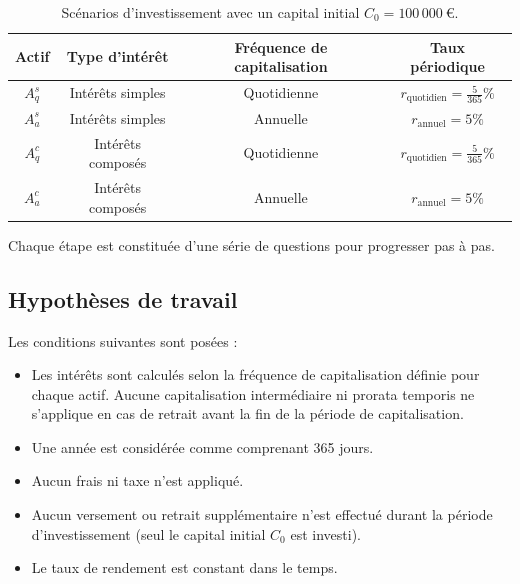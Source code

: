 \documentclass{article}
\begin{document}
\begin{table}[h!]
    \centering
    \begin{tabular}{|c|c|c|c|}
        \hline
        \textbf{Actif} & \textbf{Type d'intérêt} & \textbf{Fréquence de capitalisation} & \textbf{Taux périodique}                \\
        \hline
        \(A_q^s\)      & Intérêts simples        & Quotidienne                           & \(r_\text{quotidien} = \frac{5}{365}\%\) \\
        \hline
        \(A_a^s\)      & Intérêts simples        & Annuelle                              & \(r_\text{annuel} = 5\%\)                \\
        \hline
        \(A_q^c\)      & Intérêts composés      & Quotidienne                           & \(r_\text{quotidien} = \frac{5}{365}\%\) \\
        \hline
        \(A_a^c\)      & Intérêts composés      & Annuelle                              & \(r_\text{annuel} = 5\%\)                \\
        \hline
    \end{tabular}
    \caption{Scénarios d'investissement avec un capital initial \(C_0 = 100\,000\ \text{€}\).}
    \label{tab:scenarios}
\end{table}

Chaque étape est constituée d'une série de questions pour progresser pas à pas.

\subsection{Hypothèses de travail}
Les conditions suivantes sont posées :
\begin{itemize}
    \item Les intérêts sont calculés selon la fréquence de capitalisation définie pour chaque actif. Aucune capitalisation intermédiaire ni prorata temporis ne s'applique en cas de retrait avant la fin de la période de capitalisation.
    \item Une année est considérée comme comprenant 365 jours.
    \item Aucun frais ni taxe n'est appliqué.
    \item Aucun versement ou retrait supplémentaire n’est effectué durant la période d'investissement (seul le capital initial \( C_0 \) est investi).
    \item Le taux de rendement est constant dans le temps.
\end{itemize}
\end{document}
